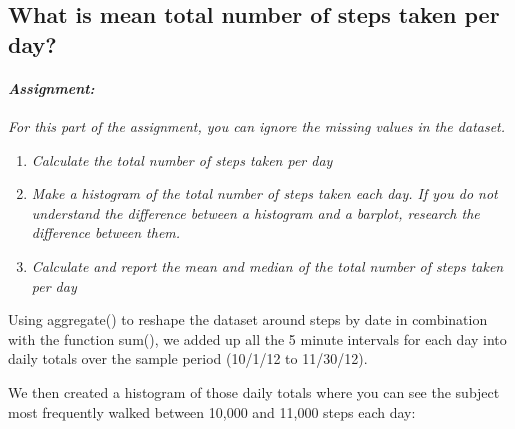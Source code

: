 \documentclass[]{article}
\providecommand{\tightlist}{%
  \setlength{\itemsep}{0pt}\setlength{\parskip}{0pt}}
\let\oldparagraph\paragraph
\renewcommand{\paragraph}[1]{\oldparagraph{#1}\mbox{}}
\begin{document}
\hypertarget{what-is-mean-total-number-of-steps-taken-per-day}{%
\subsection{What is mean total number of steps taken per
day?}\label{what-is-mean-total-number-of-steps-taken-per-day}}

\hypertarget{assignment-2}{%
\paragraph{\texorpdfstring{\emph{Assignment:}}{Assignment:}}\label{assignment-2}}

\emph{For this part of the assignment, you can ignore the missing values
in the dataset.}

\begin{enumerate}
\def\labelenumi{\arabic{enumi}.}
\tightlist
\item
  \emph{Calculate the total number of steps taken per day}\\
\item
  \emph{Make a histogram of the total number of steps taken each day. If
  you do not understand the difference between a histogram and a
  barplot, research the difference between them.}\\
\item
  \emph{Calculate and report the mean and median of the total number of
  steps taken per day}
\end{enumerate}

Using aggregate() to reshape the dataset around steps by date in
combination with the function sum(), we added up all the 5 minute
intervals for each day into daily totals over the sample period (10/1/12
to 11/30/12).

We then created a histogram of those daily totals where you can see the
subject most frequently walked between 10,000 and 11,000 steps each day:
\end{document}
